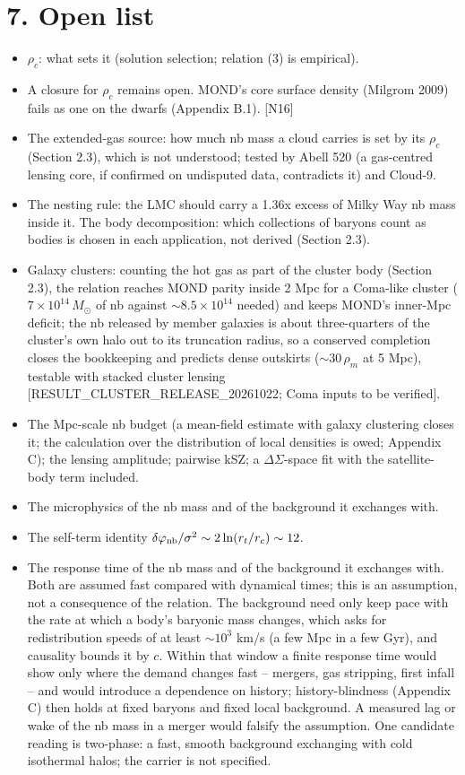 \documentclass[
  10pt,
]{article}
\begin{document}
\section{7. Open list}\label{open-list}
\begin{itemize}
\item $\rho_c$: what sets it (solution selection; relation (3) is empirical).
\item A closure for $\rho_c$ remains open. MOND's core surface density (Milgrom 2009) fails as one on the dwarfs (Appendix B.1). {[}N16{]}
\item The extended-gas source: how much nb mass a cloud carries is set by its $\rho_c$ (Section 2.3), which is not understood; tested by Abell 520 (a gas-centred lensing core, if confirmed on undisputed data, contradicts it) and Cloud-9.
\item The nesting rule: the LMC should carry a 1.36x excess of Milky Way nb mass inside it. The body decomposition: which collections of baryons count as bodies is chosen in each application, not derived (Section 2.3).
\item Galaxy clusters: counting the hot gas as part of the cluster body (Section 2.3), the relation reaches MOND parity inside 2 Mpc for a Coma-like cluster ($7\times10^{14}\,M_\odot$ of nb against $\sim8.5\times10^{14}$ needed) and keeps MOND's inner-Mpc deficit; the nb released by member galaxies is about three-quarters of the cluster's own halo out to its truncation radius, so a conserved completion closes the bookkeeping and predicts dense outskirts ($\sim30\,\rho_m$ at 5 Mpc), testable with stacked cluster lensing {[}RESULT\_CLUSTER\_RELEASE\_20261022; Coma inputs to be verified{]}.
\item The Mpc-scale nb budget (a mean-field estimate with galaxy clustering closes it; the calculation over the distribution of local densities is owed; Appendix C); the lensing amplitude; pairwise kSZ; a $\Delta\Sigma$-space fit with the satellite-body term included.
\item The microphysics of the nb mass and of the background it exchanges with.
\item The self-term identity $\delta\varphi_{\rm nb}/\sigma^2\sim 2\ln(r_t/r_c)\sim 12$.
\item The response time of the nb mass and of the background it exchanges with. Both are assumed fast compared with dynamical times; this is an assumption, not a consequence of the relation. The background need only keep pace with the rate at which a body's baryonic mass changes, which asks for redistribution speeds of at least $\sim10^3$ km/s (a few Mpc in a few Gyr), and causality bounds it by $c$. Within that window a finite response time would show only where the demand changes fast -- mergers, gas stripping, first infall -- and would introduce a dependence on history; history-blindness (Appendix C) then holds at fixed baryons and fixed local background. A measured lag or wake of the nb mass in a merger would falsify the assumption. One candidate reading is two-phase: a fast, smooth background exchanging with cold isothermal halos; the carrier is not specified.

\end{itemize}
\end{document}
